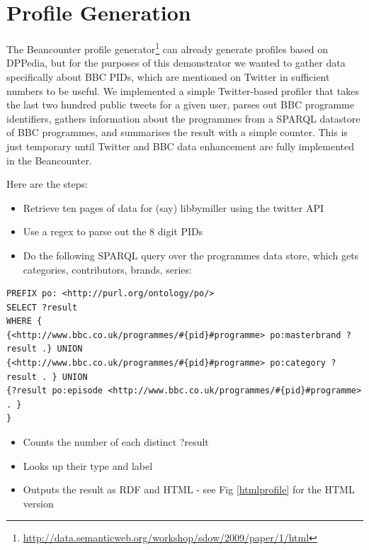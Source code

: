 \documentclass[]{article}
\begin{document}
\section{Profile Generation}

The Beancounter profile generator\footnote{\url{http://data.semanticweb.org/workshop/sdow/2009/paper/1/html}} can already generate profiles based on DPPedia, but for the purposes of this demonstrator we wanted to gather data specifically about BBC PIDs, which are mentioned on Twitter in sufficient numbers to be useful. We implemented a simple Twitter-based profiler that takes the last two hundred public tweets for a given user, parses out BBC programme identifiers, gathers information about the programmes from a SPARQL datastore of BBC programmes, and summarises the result with a simple counter. This is just temporary until Twitter and BBC data enhancement are fully implemented in the Beancounter.

Here are the steps:
\begin{itemize}
\item{Retrieve ten pages of data for (say) libbymiller using the twitter API}
\item{Use a regex to parse out the 8 digit PIDs}
\item{Do the following SPARQL query over the programmes data store, which gets categories, contributors, brands, series:}
\end{itemize}

\begin{verbatim}
PREFIX po: <http://purl.org/ontology/po/>
SELECT ?result
WHERE {
{<http://www.bbc.co.uk/programmes/#{pid}#programme> po:masterbrand ?result .} UNION
{<http://www.bbc.co.uk/programmes/#{pid}#programme> po:category ?result . } UNION
{?result po:episode <http://www.bbc.co.uk/programmes/#{pid}#programme> . }
}
\end{verbatim}


\begin{itemize}
\item{Counts the number of each distinct ?result}
\item{Looks up their type and label}
\item{Outputs the result as RDF and HTML - see Fig \ref{htmlprofile} for the HTML version}
\end{itemize}
\end{document}
